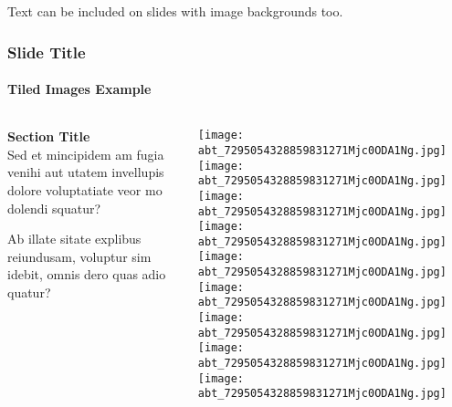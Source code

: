 \documentclass[
aspectratio=169, %
t, %
onlytextwidth, %
10pt, %
]{beamer}
\begin{document}

\begingroup
{} %

\begin{frame}
    Text can be included on slides with image backgrounds too.
\end{frame}
\endgroup


\begin{frame}
    \frametitle{Slide Title}
    \framesubtitle{Tiled Images Example}

    \small %

    \begin{columns}[T] %
        \begin{column}{0.3\linewidth} %
            \textbf{Section Title}\\
            Sed et mincipidem am fugia venihi aut utatem invellupis dolore voluptatiate veor mo dolendi squatur?

            Ab illate sitate explibus reiundusam, voluptur sim idebit, omnis dero quas adio quatur?
        \end{column}
        \begin{column}{0.68\linewidth} %
            \vspace{-3.5\baselineskip} %

            \texttt{[image: abt\_7295054328859831271Mjc0ODA1Ng.jpg]}\hfill\texttt{[image: abt\_7295054328859831271Mjc0ODA1Ng.jpg]}\hfill\texttt{[image: abt\_7295054328859831271Mjc0ODA1Ng.jpg]}\\[6pt]
            \texttt{[image: abt\_7295054328859831271Mjc0ODA1Ng.jpg]}\hfill\texttt{[image: abt\_7295054328859831271Mjc0ODA1Ng.jpg]}\hfill\texttt{[image: abt\_7295054328859831271Mjc0ODA1Ng.jpg]}\\[6pt]
            \texttt{[image: abt\_7295054328859831271Mjc0ODA1Ng.jpg]}\hfill\texttt{[image: abt\_7295054328859831271Mjc0ODA1Ng.jpg]}\hfill\texttt{[image: abt\_7295054328859831271Mjc0ODA1Ng.jpg]}\par
        \end{column}
    \end{columns}
\end{frame}
\end{document}

